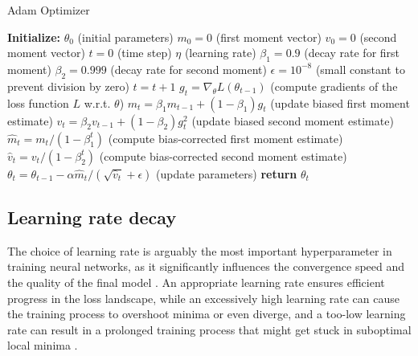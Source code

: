 \begin{algorithm}[H]
\caption{Adam Optimizer \cite{adam}}
\label{alg:Adam}
\begin{algorithmic}[1]
\State \textbf{Initialize:}
\Statex \hspace{1em} $\theta_0$ \hfill (initial parameters)
\Statex \hspace{1em} $m_0 = 0$ \hfill (first moment vector)
\Statex \hspace{1em} $v_0 = 0$ \hfill (second moment vector)
\Statex \hspace{1em} $t = 0$ \hfill (time step)
\Statex \hspace{1em} $\eta$ \hfill (learning rate)
\Statex \hspace{1em} $\beta_1 = 0.9$ \hfill (decay rate for first moment)
\Statex \hspace{1em} $\beta_2 = 0.999$ \hfill (decay rate for second moment)
\Statex \hspace{1em} $\epsilon = 10^{-8}$ \hfill (small constant to prevent division by zero)
    \State $t = t + 1$
    \State $g_t = \nabla_{\theta} L(\theta_{t-1})$ \hfill(compute gradients of the loss function $L$ w.r.t. $\theta$)
    \State $m_t = \beta_1 m_{t-1} + (1 - \beta_1) g_t$ \hfill(update biased first moment estimate)
    \State $v_t = \beta_2 v_{t-1} + (1 - \beta_2) g_t^2$ \hfill(update biased second moment estimate)
    \State $\hat{m}_t = m_t / (1 - \beta_1^t)$ \hfill(compute bias-corrected first moment estimate)
    \State $\hat{v}_t = v_t / (1 - \beta_2^t)$ \hfill(compute bias-corrected second moment estimate)\
    \State $\theta_t = \theta_{t-1} - \alpha \hat{m}_t / (\sqrt{\hat{v}_t} + \epsilon)$ \hfill(update parameters)
\EndWhile
\State \textbf{return} $\theta_t$
\end{algorithmic}
\end{algorithm}
\subsection{Learning rate decay}
The choice of learning rate is arguably the most important hyperparameter in training neural networks, as it significantly influences the convergence speed and the quality of the final model \cite{LR}\cite{Goodfellow}. An appropriate learning rate ensures efficient progress in the loss landscape, while an excessively high learning rate can cause the training process to overshoot minima or even diverge, and a too-low learning rate can result in a prolonged training process that might get stuck in suboptimal local minima \cite{Goodfellow}.

